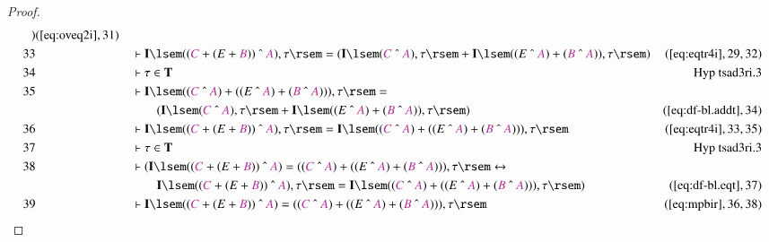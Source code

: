 \begin{proof}
\begin{align}
      )&(\mbox{\ref{eq:oveq2i}},31)\notag
  \\ 33 &&  & \vdash \mathbf{I} \lsem ( ( \mc{C} + ( E + \mc{B} ) ) ~\string^~
      \mc{A} ) , \tau \rsem = ( \mathbf{I} \lsem ( \mc{C}
      ~\string^~ \mc{A} ) , \tau \rsem + \mathbf{I} \lsem (
      ( E ~\string^~ \mc{A} ) + ( \mc{B} ~\string^~ \mc{A}
      ) ) , \tau \rsem
      )&(\mbox{\ref{eq:eqtr4i}},29,32)\notag
  \\ 34 &&  & \vdash \tau \in
      \mathbf{T}&\text{Hyp~tsad3ri.3}\notag%
  \\ 35 &&  & \vdash \mathbf{I} \lsem ( ( \mc{C} ~\string^~ \mc{A} ) + ( ( E
      ~\string^~ \mc{A} ) + ( \mc{B} ~\string^~ \mc{A} ) )
      ) , \tau \rsem =  \notag \\ & & & \qquad
     ( \mathbf{I} \lsem ( \mc{C}
      ~\string^~ \mc{A} ) , \tau \rsem + \mathbf{I} \lsem (
      ( E ~\string^~ \mc{A} ) + ( \mc{B} ~\string^~ \mc{A}
      ) ) , \tau \rsem
      )&(\mbox{\ref{eq:df-bl.addt}},34)\notag
  \\ 36 &&  & \vdash \mathbf{I} \lsem ( ( \mc{C} + ( E + \mc{B} ) ) ~\string^~
      \mc{A} ) , \tau \rsem = \mathbf{I} \lsem ( ( \mc{C}
      ~\string^~ \mc{A} ) + ( ( E ~\string^~ \mc{A} ) + (
      \mc{B} ~\string^~ \mc{A} ) ) ) , \tau
      \rsem&(\mbox{\ref{eq:eqtr4i}},33,35)\notag
  \\ 37 &&  & \vdash \tau \in
      \mathbf{T}&\text{Hyp~tsad3ri.3}\notag%
  \\ 38 &&  & \vdash ( \mathbf{I} \lsem ( ( \mc{C} + ( E + \mc{B} ) )
      ~\string^~ \mc{A} ) = ( ( \mc{C} ~\string^~ \mc{A} )
      + ( ( E ~\string^~ \mc{A} ) + ( \mc{B} ~\string^~
      \mc{A} ) ) ) , \tau \rsem \leftrightarrow  \notag \\ & & & \qquad
     \mathbf{I}
      \lsem ( ( \mc{C} + ( E + \mc{B} ) ) ~\string^~ \mc{A}
      ) , \tau \rsem = \mathbf{I} \lsem ( ( \mc{C}
      ~\string^~ \mc{A} ) + ( ( E ~\string^~ \mc{A} ) + (
      \mc{B} ~\string^~ \mc{A} ) ) ) , \tau \rsem
      )&(\mbox{\ref{eq:df-bl.eqt}},37)\notag
  \\ 39 &&  & \vdash \mathbf{I} \lsem ( ( \mc{C} + ( E + \mc{B} ) ) ~\string^~
      \mc{A} ) = ( ( \mc{C} ~\string^~ \mc{A} ) + ( ( E
      ~\string^~ \mc{A} ) + ( \mc{B} ~\string^~ \mc{A} ) )
      ) , \tau \rsem&(\mbox{\ref{eq:mpbir}},36,38)\notag
\end{align}
\end{proof}

